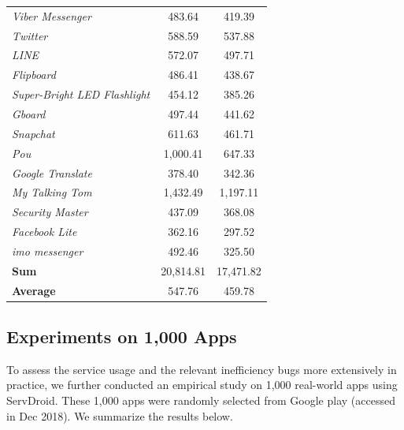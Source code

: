 \documentclass[sigconf,review, anonymous]{acmart}
\begin{document}
\begin{table}
\begin{tabular}{|l|cc|}
{\it Viber Messenger}&483.64&419.39\\
{\it Twitter}&588.59&537.88\\
{\it LINE}&572.07&497.71\\
{\it Flipboard}&486.41&438.67\\
{\it Super-Bright LED Flashlight}&454.12&385.26\\
{\it Gboard}&497.44&441.62\\
{\it Snapchat}&611.63&461.71\\
{\it Pou}&1,000.41&647.33\\
{\it Google Translate}&378.40&342.36\\
{\it My Talking Tom}&1,432.49&1,197.11\\
{\it Security Master}&437.09&368.08\\
{\it Facebook Lite}&362.16&297.52\\
{\it imo messenger}&492.46&325.50\\
\hline
{\bf Sum}&20,814.81&17,471.82\\
\hline
{\bf Average}&547.76&459.78\\
\hline
\end{tabular}
\label{tab_energy}
\end{table}


\subsection{Experiments on 1,000 Apps}

To assess the service usage and the relevant inefficiency bugs more
extensively in practice, we further conducted an empirical study on 1,000
real-world apps using \textsf{ServDroid}. These 1,000 apps were randomly
selected from Google play (accessed in Dec 2018). We summarize the results below.
\end{document}
